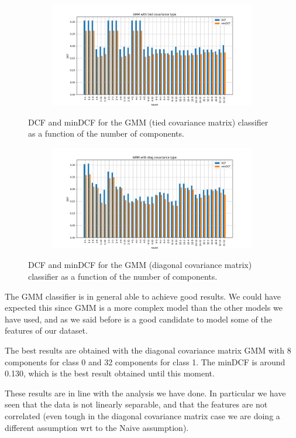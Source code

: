 \documentclass[12pt]{report}
\newcommand{\nnl}{%
    \newline
    \newline
}
\newcommand{\nl}{%
    \newline
    \noindent
}
\begin{document}
\begin{figure}[H]
    \centering
    \begin{subfigure}[t]{0.6\textwidth}
        \includegraphics[width=\textwidth]{./plot/GMM/gmm_tied.png}
    \end{subfigure}
    \caption{DCF and minDCF for the GMM (tied covariance matrix) classifier as a function of the number of components.}
    \label{fig:gmm_tied}
\end{figure}

\begin{figure}[H]
    \centering
    \begin{subfigure}[t]{0.6\textwidth}
        \includegraphics[width=\textwidth]{./plot/GMM/gmm_diag.png}
    \end{subfigure}
    \caption{DCF and minDCF for the GMM (diagonal covariance matrix) classifier as a function of the number of components.}
    \label{fig:gmm_diag}
\end{figure}
\noindent
The GMM classifier is in general able to achieve good results. We could have expected this since GMM is a more complex model than the other models we have used, and as we said before is a good candidate to model some of the features of our dataset.
\nnl
The best results are obtained with the diagonal covariance matrix GMM with 8 components for class 0 and 32 components for class 1. The minDCF is around 0.130, which is the best result obtained until this moment.
\nl
These results are in line with the analysis we have done. In particular we have seen that the data is not linearly separable, and that the features are not correlated (even tough in the diagonal covariance matrix case we are doing a different assumption wrt to the Naive assumption).
\end{document}
